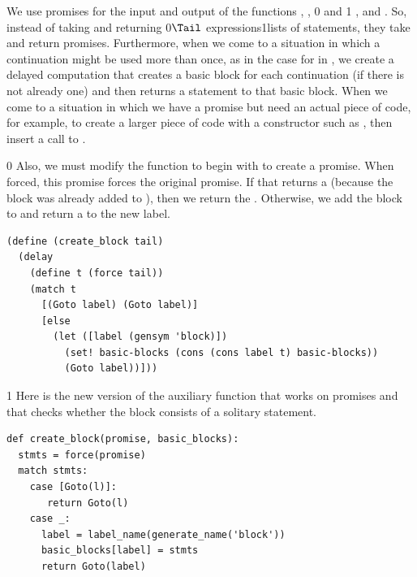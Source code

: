 \documentclass[7x10]{TimesAPriori_MIT}%
\def\racketEd{0}
\def\pythonEd{1}
\def\edition{0}
\newcommand{\racket}[1]{{\if\edition\racketEd{#1}\fi}}
\newcommand{\python}[1]{{\if\edition\pythonEd #1\fi}}
\numberwithin{theorem}{chapter}
\numberwithin{definition}{chapter}
\numberwithin{equation}{chapter}
\begin{document}
We use promises for the input and output of the functions
, ,
%
\racket{ and }\python{ , and }.
%
So, instead of taking and returning \racket{$\Tail$
  expressions}\python{lists of statements}, they take and return
promises. Furthermore, when we come to a situation in which a
continuation might be used more than once, as in the case for
 in , we create a delayed computation
that creates a basic block for each continuation (if there is not
already one) and then returns a  statement to that basic
block. When we come to a situation in which we have a promise but need an
actual piece of code, for example, to create a larger piece of code with a
constructor such as , then insert a call to .
%
{\if\edition\racketEd
%
Also, we must modify the  function to begin with
 to create a promise. When forced, this promise forces the
original promise. If that returns a  (because the block was
already added to ), then we return the
. Otherwise, we add the block to  and
return a  to the new label.
\begin{center}
\begin{minipage}{\textwidth}
\begin{lstlisting}
(define (create_block tail)
  (delay
    (define t (force tail))
    (match t
      [(Goto label) (Goto label)]
      [else
        (let ([label (gensym 'block)])
          (set! basic-blocks (cons (cons label t) basic-blocks))
          (Goto label))]))
\end{lstlisting}
\end{minipage}
\end{center}
\fi}
{\if\edition\pythonEd
%
Here is the new version of the  auxiliary function
that works on promises and that checks whether the block consists of a
solitary  statement.\\
\begin{minipage}{\textwidth}
\begin{lstlisting}
def create_block(promise, basic_blocks):
  stmts = force(promise)
  match stmts:
    case [Goto(l)]:
       return Goto(l)
    case _:
      label = label_name(generate_name('block'))
      basic_blocks[label] = stmts
      return Goto(label)
\end{lstlisting}
\end{minipage}

\fi}
\end{document}
